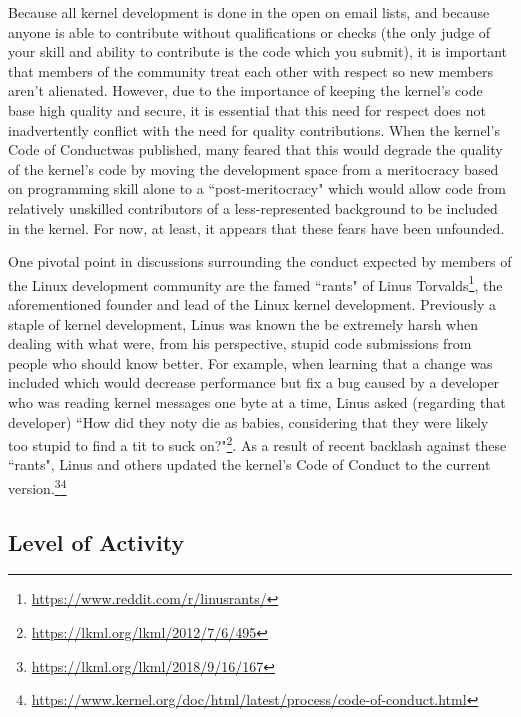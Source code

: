 \documentclass[11pt]{article}
\begin{document}
Because all kernel development is done in the open on email lists, and because anyone is able to contribute without qualifications or checks (the only judge of your skill and ability to contribute is the code which you submit), it is important that members of the community treat each other with respect so new members aren't alienated.  However, due to the importance of keeping the kernel's code base high quality and secure, it is essential that this need for respect does not inadvertently conflict with the need for quality contributions.  When the kernel's Code of Conduct\footnotemark was published, many feared that this would degrade the quality of the kernel's code by moving the development space from a meritocracy based on programming skill alone to a ``post-meritocracy" which would allow code from relatively unskilled contributors of a less-represented background to be included in the kernel.  For now, at least, it appears that these fears have been unfounded.

One pivotal point in discussions surrounding the conduct expected by members of the Linux development community are the famed ``rants" of Linus Torvalds\footnote{\url{https://www.reddit.com/r/linusrants/}}, the aforementioned founder and lead of the Linux kernel development.  Previously a staple of kernel development, Linus was known the be extremely harsh when dealing with what were, from his perspective, stupid code submissions from people who should know better.  For example, when learning that a change was included which would decrease performance but fix a bug caused by a developer who was reading kernel messages one byte at a time, Linus asked (regarding that developer) ``How did they noty die as babies, considering that they were likely too stupid to find a tit to suck on?"\footnote{\url{https://lkml.org/lkml/2012/7/6/495}}.  As a result of recent backlash against these ``rants", Linus and others updated the kernel's Code of Conduct to the current version.\footnote{\url{https://lkml.org/lkml/2018/9/16/167}}\footnote{\url{https://www.kernel.org/doc/html/latest/process/code-of-conduct.html}}\addtocounter{footnote}{-1}\addtocounter{Hfootnote}{-1}

\subsection{Level of Activity}
\label{subsec:kernel_activity}
\end{document}
